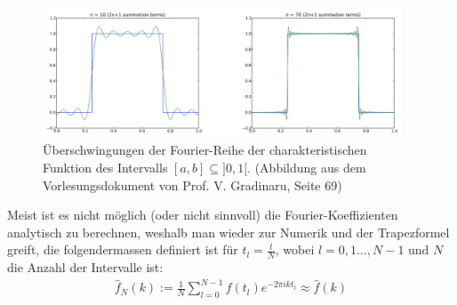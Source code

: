 \begin{figure}[h!]
    \begin{center}
        \includegraphics[width=0.95\textwidth]{assets/01_interpolation/01_trigonometric/overarcing.png}
    \end{center}
    \caption{Überschwingungen der Fourier-Reihe der charakteristischen Funktion des Intervalls $[a, b] \subseteq ]0, 1[$.
        (Abbildung aus dem Vorlesungsdokument von Prof. V. Gradinaru, Seite 69)}
    \label{fig:trigo-interp-overarcing}
\end{figure}

\inlineremark Meist ist es nicht möglich (oder nicht sinnvoll) die Fourier-Koeffizienten analytisch zu berechnen,
weshalb man wieder zur Numerik und der Trapezformel greift, die folgendermassen definiert ist für $t_l = \frac{l}{N}$,
wobei $l = 0, 1 \ldots, N - 1$ und $N$ die Anzahl der Intervalle ist:
\begin{align*}
    \hat{f}_N(k) := \frac{1}{N} \sum_{l = 0}^{N - 1} f(t_l) e^{-2\pi ikt_l} \approx \hat{f}(k)
\end{align*}



